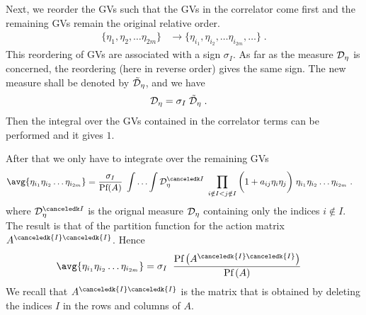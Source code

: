 Next, we reorder the GVs such that the GVs in the correlator come first 
and the remaining GVs remain the original relative order.
%
\begin{align*}
\{\eta_{1}, \eta_{2}, \ldots \eta_{2m}\}
&\longrightarrow 
\{\eta_{i_{1}}, \eta_{i_{2}}, \ldots \eta_{i_{2m}},\ldots\}\;.
\end{align*}
%
This reordering of GVs are associated with a sign $\sigma_{I}$.
As far as the measure ${\cal D}_{\eta}$ is concerned, the reordering (here in reverse order) gives the same sign. 
The new measure shall be denoted by 
$\tilde {\cal D}_{\eta}$, and we have
%
\begin{align*}
{\cal D}_{\eta}  &= \sigma_{I}\;\tilde {\cal D}_{\eta}\;.
\end{align*}
%
Then the integral  over the GVs contained in the
correlator terms can be performed and it gives $1$. 


After that we only have to integrate over the remaining GVs 
%
%
\begin{align*}
\avg{\eta_{i_{1}}\eta_{i_{2}}\ldots \eta_{i_{2 m}}} 
&=\frac{\sigma_{I}}{\text{Pf}(A)}\;\Int \Detax  \; \prod_{i\notin I<j\notin I}
\bigg( 1 + a_{ij}\eta_{i}\eta_{j} \bigg)\;
\eta_{i_{1}}\eta_{i_{2}}\ldots \eta_{i_{2 m}}\;.
\end{align*}
%
%
where $\Detax$ is the orignal measure ${\cal D}_{\eta}$ containing only  the indices 
$i\notin I$.
The result is that of the partition function for the action matrix $A^{\canceledk{I}\canceledk{I}}$. 
Hence
%
\begin{align*}
\avg{\eta_{i_{1}}\eta_{i_{2}}\ldots \eta_{i_{2 m}}} 
&=\sigma_{I}\;
\;\frac{\Pf{ A^{\canceledk{I}\canceledk{I} } }}{\Pf{A}}
\end{align*}
%
We recall that $A^{\canceledk{I}\canceledk{I}}$ is the matrix that is obtained by 
deleting the indices $I$ in the rows and columns of $A$. 

